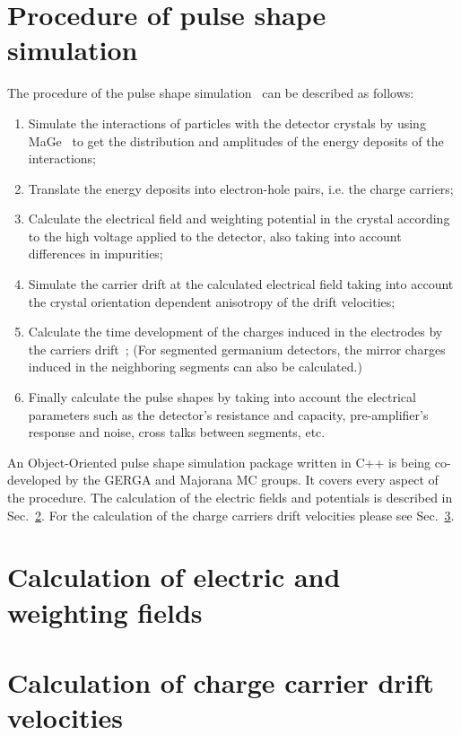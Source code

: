 \section{Procedure of pulse shape simulation}
\label{sec:pss:proc}
The procedure of the pulse shape simulation~\cite{agata} can be described as follows:
\begin{enumerate}
\item Simulate the interactions of particles with the detector   crystals by using MaGe~\cite{Mag08} to get the distribution and   amplitudes of the energy deposits of the interactions;
\item Translate the energy deposits into electron-hole pairs, i.e.   the charge carriers;
\item Calculate the electrical field and weighting potential in the   crystal according to the high voltage applied to the detector, also   taking into account differences in impurities;
\item Simulate the carrier drift at the calculated electrical field   taking into account the crystal orientation dependent anisotropy of   the drift velocities;
\item Calculate the time development of the charges induced in the   electrodes by the carriers drift~\cite{igex}; (For segmented   germanium detectors, the mirror charges induced in the neighboring   segments can also be calculated.)
\item Finally calculate the pulse shapes by taking into account the   electrical parameters such as the detector's resistance and   capacity, pre-amplifier's response and noise, cross talks between   segments, etc.
\end{enumerate}
An Object-Oriented pulse shape simulation package written in C++ is being co-developed by the GERGA and Majorana MC groups. It covers every aspect of the procedure. The calculation of the electric fields and potentials is described in Sec.~\ref{sec:pss:field}. For the calculation of the charge carriers drift velocities please see Sec.~\ref{sec:pss:drift}.

\section{Calculation of electric and weighting fields}
\label{sec:pss:field}

\section{Calculation of charge carrier drift velocities}
\label{sec:pss:drift}
